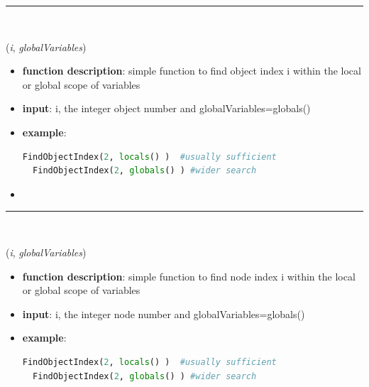\begin{itemize}[leftmargin=1.4cm]
%
\noindent\rule{8cm}{0.75pt}\vspace{1pt} \\ 
\begin{flushleft}
\label{sec:advancedUtilities:FindObjectIndex}
({\it i}, {\it globalVariables})
\end{flushleft}
\setlength{\itemindent}{0.7cm}
\begin{itemize}[leftmargin=0.7cm]
\item[--]
{\bf function description}: simple function to find object index i within the local or global scope of variables
\item[--]
{\bf input}: i, the integer object number and  globalVariables=globals()
\item[--]
{\bf example}: \vspace{-12pt}\ei\begin{lstlisting}[language=Python, xleftmargin=36pt]
  FindObjectIndex(2, locals() )  #usually sufficient
  FindObjectIndex(2, globals() ) #wider search
\end{lstlisting}\vspace{-24pt}\bi\item[]\vspace{-24pt}\vspace{12pt}\end{itemize}
%
\noindent\rule{8cm}{0.75pt}\vspace{1pt} \\ 
\begin{flushleft}
\label{sec:advancedUtilities:FindNodeIndex}
({\it i}, {\it globalVariables})
\end{flushleft}
\setlength{\itemindent}{0.7cm}
\begin{itemize}[leftmargin=0.7cm]
\item[--]
{\bf function description}: simple function to find node index i within the local or global scope of variables
\item[--]
{\bf input}: i, the integer node number and  globalVariables=globals()
\item[--]
{\bf example}: \vspace{-12pt}\ei\begin{lstlisting}[language=Python, xleftmargin=36pt]
  FindObjectIndex(2, locals() )  #usually sufficient
  FindObjectIndex(2, globals() ) #wider search

\end{lstlisting}
\end{itemize}
\end{itemize}
